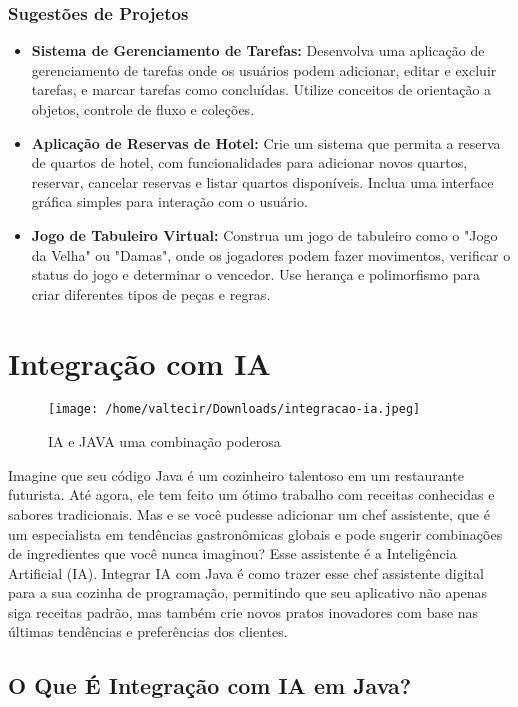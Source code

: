 \documentclass[a4paper,12pt]{book}
\begin{document}
\subsection{Sugestões de Projetos}
\begin{itemize}
    \item \textbf{Sistema de Gerenciamento de Tarefas:} Desenvolva uma aplicação de gerenciamento de tarefas onde os usuários podem adicionar, editar e excluir tarefas, e marcar tarefas como concluídas. Utilize conceitos de orientação a objetos, controle de fluxo e coleções.
    \item \textbf{Aplicação de Reservas de Hotel:} Crie um sistema que permita a reserva de quartos de hotel, com funcionalidades para adicionar novos quartos, reservar, cancelar reservas e listar quartos disponíveis. Inclua uma interface gráfica simples para interação com o usuário.
    \item \textbf{Jogo de Tabuleiro Virtual:} Construa um jogo de tabuleiro como o "Jogo da Velha" ou "Damas", onde os jogadores podem fazer movimentos, verificar o status do jogo e determinar o vencedor. Use herança e polimorfismo para criar diferentes tipos de peças e regras.
\end{itemize}

\chapter{Integração com IA}

\begin{figure}[H]
    \centering
    \texttt{[image: /home/valtecir/Downloads/integracao-ia.jpeg]}
    \caption{IA e JAVA uma combinação poderosa}
    \label{fig:exemplo}
\end{figure}

Imagine que seu código Java é um cozinheiro talentoso em um restaurante futurista. Até agora, ele tem feito um ótimo trabalho com receitas conhecidas e sabores tradicionais. Mas e se você pudesse adicionar um chef assistente, que é um especialista em tendências gastronômicas globais e pode sugerir combinações de ingredientes que você nunca imaginou? Esse assistente é a Inteligência Artificial (IA). Integrar IA com Java é como trazer esse chef assistente digital para a sua cozinha de programação, permitindo que seu aplicativo não apenas siga receitas padrão, mas também crie novos pratos inovadores com base nas últimas tendências e preferências dos clientes.

\section*{O Que É Integração com IA em Java?}
\end{document}

